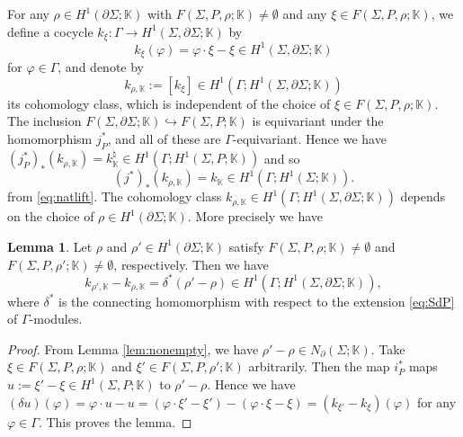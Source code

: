 \documentclass[a4paper,12pt, twoside]{amsart}
\theoremstyle{definition}
\newtheorem{lem}[dfn]{Lemma}
\theoremstyle{remark}
\numberwithin{equation}{section}
\newcommand\bK{{\mathbb{K}}}
\newcommand\pa{\partial}
\begin{document}
For any $\rho \in H^1(\pa\Sigma; \bK)$ with $F(\Sigma, P, \rho; \bK)\neq\emptyset$ and any $\xi \in F(\Sigma, P, \rho; \bK)$, we define a cocycle $k_\xi: \Gamma \to H^1(\Sigma, \pa\Sigma; \bK)$ by
$$
k_\xi(\varphi) = \varphi\cdot \xi - \xi \in H^1(\Sigma, \pa\Sigma;\bK)
$$
for $\varphi \in \Gamma$, and denote by
$$
k_{\rho, \bK} := [k_\xi] \in H^1(\Gamma; H^1(\Sigma, \pa\Sigma;\bK))
$$
its cohomology class, which is independent of the choice of $\xi \in F(\Sigma, P, \rho; \bK)$. 
The inclusion $F(\Sigma, \pa\Sigma; \bK) \hookrightarrow F(\Sigma, P; \bK)$ is equivariant under the homomorphism $j^*_P$, and all of these are $\Gamma$-equivariant. 
Hence we have 
$(j^*_P)_*(k_{\rho, \bK}) = k^\natural_\bK \in H^1(\Gamma; H^1(\Sigma, P; \bK))$ and so 
\begin{equation}\label{eq:blift}
(j^*)_*(k_{\rho, \bK}) = k_\bK \in H^1(\Gamma; H^1(\Sigma; \bK)).
\end{equation}
from \eqref{eq:natlift}. The cohomology class $k_{\rho, \bK} \in H^1(\Gamma; H^1(\Sigma, \pa\Sigma; \bK))$ depends on the choice of $\rho \in H^1(\pa\Sigma; \bK)$. More precisely we have
\begin{lem}\label{lem:crho} Let $\rho$ and $\rho' \in H^1(\pa\Sigma; \bK)$ satisfy $F(\Sigma, P, \rho; \bK)\neq\emptyset$ and $F(\Sigma, P, \rho'; \bK)\neq\emptyset$, respectively. Then we have 
$$
k_{\rho', \bK} - k_{\rho, \bK} = \delta^*(\rho'-\rho) \in H^1(\Gamma; H^1(\Sigma, \pa\Sigma;\bK)),
$$
where $\delta^*$ is the connecting homomorphism with respect to the extension \eqref{eq:SdP} of $\Gamma$-modules.
\end{lem}
\begin{proof} From Lemma \ref{lem:nonempty}, we have $\rho' - \rho \in N_\pa(\Sigma; \bK)$. 
Take $\xi \in F(\Sigma, P, \rho; \bK)$ and $\xi' \in F(\Sigma, P, \rho'; \bK)$ arbitrarily. Then the map $i^*_P$ maps $u := \xi'-\xi \in H^1(\Sigma, P; \bK)$ to $\rho' - \rho$. 
Hence we have $(\delta u)(\varphi) = \varphi\cdot u - u = (\varphi\cdot \xi' - \xi') - (\varphi\cdot\xi - \xi) = (k_{\xi'}-k_\xi)(\varphi)$ for any $\varphi \in \Gamma$. This proves the lemma. 
\end{proof}
\end{document}
